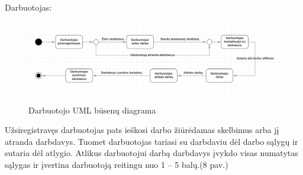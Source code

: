 \documentclass{VUMIFPSkursinis}
\begin{document}
Darbuotojas:
\begin{figure}[H]
\centering
\includegraphics[width=\linewidth]{img/va5.png}
\caption{Darbuotojo UML būsenų diagrama}
\end{figure}
Užsiregistravęs darbuotojas pats ieškosi darbo žiūrėdamas skelbimus arba jį atranda darbdavys. Tuomet darbuotojas tariasi su darbdaviu dėl darbo sąlygų ir sutaria dėl atlygio. Atlikus darbuotojui darbą darbdavys įvykdo visas numatytas sąlygas ir įvertina darbuotoją reitingu nuo 1 – 5 balų.(8 pav.)
\newpage
\end{document}
